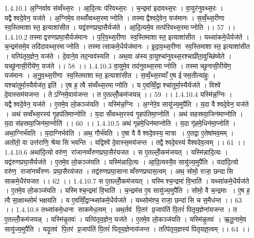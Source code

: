 1.4.10.1
अ॒ग्निर्वाव स॑व्वँथ्स॒रः । आ॒दि॒त्यः प॑रिवथ्स॒रः । च॒न्द्रमा॑ इदावथ्स॒रः । वा॒युर॑नुवथ्स॒रः । यद्वैश्वदे॒वेन॒ यज॑ते । अ॒ग्निमे॒व तथ्सँ॑व्वथ्स॒रमाप्नोति । तस्माद्वैश्वदे॒वेन॒ यज॑मानः । स॒व्वँ॒थ्स॒रीणा॑ स्व॒स्तिमाशास्त॒ इत्याशा॑सीत । यद्व॑रुणप्रघा॒सैर्यज॑ते । आ॒दि॒त्यमे॒व तत्प॑रिवथ्स॒रमाप्नोति ।। 57 ।।
1.4.10.2
तस्माद्वरुणप्रघा॒सैर्यज॑मानः । प॒रि॒व॒थ्स॒रीणा॑ स्व॒स्तिमाशास्त॒ इत्याशा॑सीत । यथ्सा॑कमे॒धैर्यज॑ते । च॒न्द्रम॑समे॒व तदि॑दावथ्स॒रमाप्नोति । तस्मात्साकमे॒धैर्यज॑मानः । इ॒दा॒व॒थ्स॒रीणा॑ स्व॒स्तिमाशास्त॒ इत्याशा॑सीत । यत्पि॑तृय॒ज्ञेन॒ यज॑ते । दे॒वाने॒व तद॒न्वव॑स्यति । अथ॒वा अ॑स्य वा॒युश्चा॑नुवथ्स॒रश्चाप्री॑ता॒वुच्छि॑ष्येते । यच्छु॑नासी॒रीये॑ण॒ यज॑ते ।। 58 ।।
1.4.10.3
वा॒युमे॒व तद॑नुवथ्स॒रमाप्नोति । तस्माच्छुनासी॒रीये॑ण॒ यज॑मानः । अ॒नु॒व॒थ्स॒रीणा॑ स्व॒स्तिमाशास्त॒ इत्याशा॑सीत । स॒व्वँ॒थ्स॒रव्वाँ ए॒ष ईफ्स॒तीत्या॑हुः । यश्चा॑तुर्मा॒स्यैर्यज॑त॒ इति॑ । ए॒ष ह॒ त्वै स॑व्वँथ्स॒रमाप्नोति । य ए॒वव्विँ॒द्वाश्चा॑तुर्मा॒स्यैर्यज॑ते । विश्वे॑ दे॒वास्सम॑यजन्त । तेऽग्निमे॒वाय॑जन्त । त ए॒तल्लोँ॒कम॑जयन्न् ।। 59 ।।
1.4.10.4
यस्मि॑न्न॒ग्निः । यद्वैश्वदे॒वेन॒ यज॑ते । ए॒तमे॒व लो॒कञ्ज॑यति । यस्मि॑न्न॒ग्निः । अ॒ग्नेरे॒व सायु॑ज्य॒मुपै॑ति । य॒दा वैश्वदे॒वेन॒ यज॑ते । अथ॑ सव्वँथ्स॒रस्य॑ गृ॒हप॑तिमाप्नोति । य॒दा सँ॑व्वथ्स॒रस्य॑ गृ॒हप॑तिमा॒प्नोति॑ । अथ॑ सहस्रया॒जिन॑माप्नोति । य॒दा स॑हस्रया॒जिन॑मा॒प्नोति॑ ।। 60 ।।
1.4.10.5
अथ॑ गृहमे॒धिन॑माप्नोति । य॒दा गृ॑हमे॒धिन॑मा॒प्नोति॑ । अथा॒ग्निर्भ॑वति । य॒दाग्निर्भव॑ति । अथ॒ गौर्भ॑वति । ए॒षा वै वैश्वदे॒वस्य॒ मात्रा । ए॒तद्वा ए॒तेषा॑मव॒मम् । अतो॑तो॒ वा उत्त॑राणि॒ श्रेया॑सि भवन्ति । यद्विश्वे॑ दे॒वास्स॒मय॑जन्त । तद्वैश्वदे॒वस्य॑ वैश्वदेव॒त्वम् ।। 61 ।।
1.4.10.6
अथा॑दि॒त्यो वरु॑ण॒॒ रा॑जानव्वँरुणप्रघा॒सैर॑यजत । स ए॒तल्लोँ॒कम॑जयत् । यस्मि॑न्नादि॒त्यः । यद्व॑रुणप्रघा॒सैर्यज॑ते । ए॒तमे॒व लो॒कञ्ज॑यति । यस्मि॑न्नादि॒त्यः । आ॒दि॒त्यस्यै॒व सायु॑ज्य॒मुपै॑ति । यदा॑दि॒त्यो वरु॑ण॒॒ राजा॑नव्वँरुण- प्रघा॒सैरय॑जत । तद्व॑रुणप्रघा॒सानाव्वँरुणप्रघास॒त्वम् । अथ॒ सोमो॒ राजा॒ छन्दा॑सि साकमे॒धैर॑यजत ।। 62 ।।
1.4.10.7
स ए॒तल्लोँ॒कम॑जयत् । यस्मि॑श्च॒न्द्रमा॑ वि॒भाति॑ । यथ्सा॑कमे॒धैर्यज॑ते । ए॒तमे॒व लो॒कञ्ज॑यति । यस्मि॑श्च॒न्द्रमा॑ वि॒भाति॑ । च॒न्द्रम॑स ए॒व सायु॑ज्य॒मुपै॑ति । सोमो॒ वै च॒न्द्रमाः । ए॒ष ह॒ त्वै सा॒क्षाथ्सोमं॑ भक्षयति । य ए॒वव्विँ॒द्वान्थ्सा॑कमे॒धैर्यज॑ते । यथ्सोम॑श्च॒ राजा॒ छन्दा॑सि च स॒मैध॑न्त ।। 63 ।।
1.4.10.8
तथ्सा॑कमे॒धाना॑ साकमेध॒त्वम् । अथ॒र्तव॑ पि॒तर॑ प्र॒जाप॑तिं पि॒तरं॑ पितृय॒ज्ञेना॑यजन्त । त ए॒तल्लोँ॒कम॑जयन्न् । यस्मि॑न्नृ॒तवः॑ । यत्पि॑तृय॒ज्ञेन॒ यज॑ते । ए॒तमे॒व लो॒कञ्ज॑यति । यस्मि॑न्नृ॒तवः॑ । ऋ॒तू॒नामे॒व सायु॑ज्य॒मुपै॑ति । यदृ॒तव॑ पि॒तर॑ प्र॒जाप॑तिं पि॒तरं॑ पितृय॒ज्ञेनाय॑जन्त । तत्पि॑तृय॒ज्ञस्य॑ पितृयज्ञ॒त्वम् ।। 64 ।।
